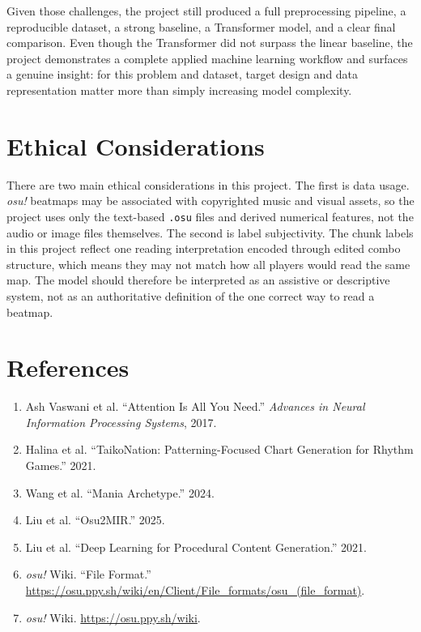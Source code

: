 \documentclass[final]{article}
\begin{document}
Given those challenges, the project still produced a full preprocessing pipeline, a reproducible dataset, a strong baseline, a Transformer model, and a clear final comparison. Even though the Transformer did not surpass the linear baseline, the project demonstrates a complete applied machine learning workflow and surfaces a genuine insight: for this problem and dataset, target design and data representation matter more than simply increasing model complexity.

\section*{Ethical Considerations}
There are two main ethical considerations in this project. The first is data usage. \textit{osu!} beatmaps may be associated with copyrighted music and visual assets, so the project uses only the text-based \texttt{.osu} files and derived numerical features, not the audio or image files themselves. The second is label subjectivity. The chunk labels in this project reflect one reading interpretation encoded through edited combo structure, which means they may not match how all players would read the same map. The model should therefore be interpreted as an assistive or descriptive system, not as an authoritative definition of the one correct way to read a beatmap.

\newpage
\section*{References}
\begin{enumerate}
    \item Ash Vaswani et al. ``Attention Is All You Need.'' \emph{Advances in Neural Information Processing Systems}, 2017.
    \item Halina et al. ``TaikoNation: Patterning-Focused Chart Generation for Rhythm Games.'' 2021.
    \item Wang et al. ``Mania Archetype.'' 2024.
    \item Liu et al. ``Osu2MIR.'' 2025.
    \item Liu et al. ``Deep Learning for Procedural Content Generation.'' 2021.
    \item \textit{osu!} Wiki. ``File Format.'' \url{https://osu.ppy.sh/wiki/en/Client/File_formats/osu_(file_format)}.
    \item \textit{osu!} Wiki. \url{https://osu.ppy.sh/wiki}.
\end{enumerate}
\end{document}
